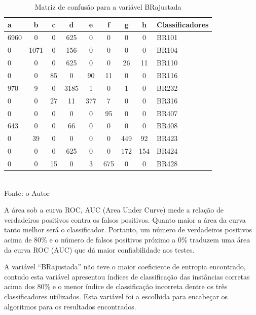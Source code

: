 \begin{enumerate}
	\begin{table}[!ht]
		\centering
		\caption{Matriz de confusão para a variável BRajustada}
		\vspace{1mm}
		\begin{tabular}{l|c|c|c|c|c|c|c|l}
			\hline
			\textbf{a} & \textbf{b} & \textbf{c} & \textbf{d} & \textbf{e} & \textbf{f} & \textbf{g} & \textbf{h} & \textbf{Classificadores}\\
			\hline
			6960 & 0 & 0 & 625 & 0 & 0 & 0 & 0 & BR101 \\
			0 & 1071 & 0 & 156 & 0 & 0 & 0 & 0  & BR104 \\
			0 & 0 & 0 & 625 & 0 & 0 & 26 & 11  & BR110 \\
			0 & 0 & 85 & 0 & 90 & 11 & 0 & 0  & BR116 \\
			970 & 9 & 0 & 3185 & 1 & 0 & 1 & 0  & BR232 \\
			0 & 0 & 27 & 11 & 377 & 7 & 0 & 0  & BR316 \\
			0 & 0 & 0 & 0 & 0 & 95 & 0 & 0  & BR407 \\
			643 & 0 & 0 & 66 & 0 & 0 & 0 & 0  & BR408 \\
			0 & 39 & 0 & 0 & 0 & 0 & 449 & 92  & BR423 \\
			0 & 0 & 0 & 625 & 0 & 0 & 172 & 154  & BR424 \\
			0 & 0 & 15 & 0 & 3 & 675 & 0 & 0  & BR428 \\			
		\end{tabular}
		\\
		\tiny Fonte: o Autor
	\end{table}	

\end{enumerate}

A área sob a curva ROC, AUC (Area Under Curve) mede a
relação de verdadeiros positivos contra os falsos positivos.
Quanto maior a área da curva tanto melhor será o
classificador. Portanto, um número de verdadeiros positivos
acima de 80\% e o número de falsos positivos próximo a 0\%
traduzem uma área da curva ROC (AUC) que dá maior confiabilidade
aos testes.

A variável “BRajustada” não teve o maior coeficiente de
entropia encontrado, contudo esta variável apresentou
índices de classificação das instâncias corretas acima dos 80\% e
o menor índice de classificação incorreta dentre os três
classificadores utilizados. Esta variável foi a escolhida para
encabeçar os algoritmos para os resultados encontrados. 

\pagebreak

